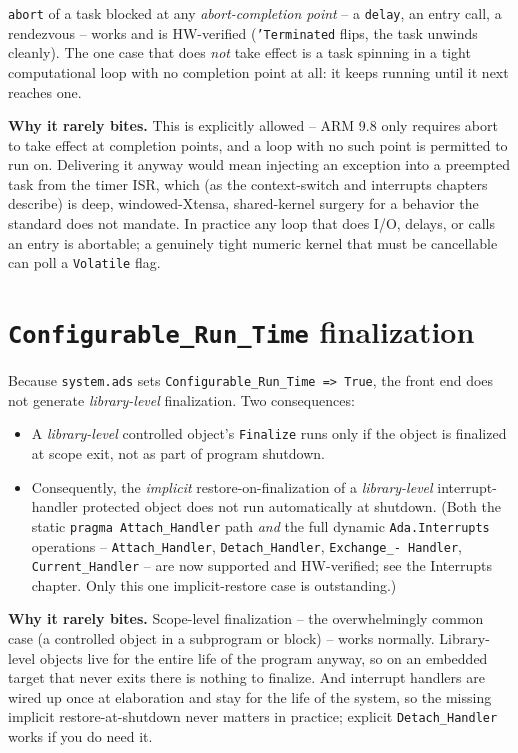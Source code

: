 \texttt{abort} of a task blocked at any \emph{abort-completion point} --
a \texttt{delay}, an entry call, a rendezvous -- works and is HW-verified
(\texttt{'Terminated} flips, the task unwinds cleanly). The one case that does
\emph{not} take effect is a task spinning in a tight computational loop with no
completion point at all: it keeps running until it next reaches one.

\textbf{Why it rarely bites.} This is explicitly allowed -- ARM 9.8 only
requires abort to take effect at completion points, and a loop with no such point
is permitted to run on. Delivering it anyway would mean injecting an exception
into a preempted task from the timer ISR, which (as the context-switch and
interrupts chapters describe) is deep, windowed-Xtensa, shared-kernel surgery
for a behavior the standard does not mandate. In practice any loop that
does I/O, delays, or calls an entry is abortable; a genuinely tight numeric
kernel that must be cancellable can poll a \texttt{Volatile} flag.

\section{\texttt{Configurable\_Run\_Time} finalization}

Because \texttt{system.ads} sets \texttt{Configurable\_Run\_Time => True}, the
front end does not generate \emph{library-level} finalization. Two consequences:

\begin{itemize}
  \item A \emph{library-level} controlled object's \texttt{Finalize} runs only if
        the object is finalized at scope exit, not as part of program shutdown.
  \item Consequently, the \emph{implicit} restore-on-finalization of a
        \emph{library-level} interrupt-handler protected object does not run
        automatically at shutdown. (Both the static \texttt{pragma Attach\_Handler}
        path \emph{and} the full dynamic \texttt{Ada.Interrupts} operations --
        \texttt{Attach\_Handler}, \texttt{Detach\_Handler}, \texttt{Exchange\_-
        Handler}, \texttt{Current\_Handler} -- are now supported and
        HW-verified; see the Interrupts chapter. Only this one implicit-restore
        case is outstanding.)
\end{itemize}

\textbf{Why it rarely bites.} Scope-level finalization -- the overwhelmingly
common case (a controlled object in a subprogram or block) -- works normally.
Library-level objects live for the entire life of the program anyway, so on an
embedded target that never exits there is nothing to finalize. And interrupt
handlers are wired up once at elaboration and stay for the life of the system, so
the missing implicit restore-at-shutdown never matters in practice; explicit
\texttt{Detach\_Handler} works if you do need it.


